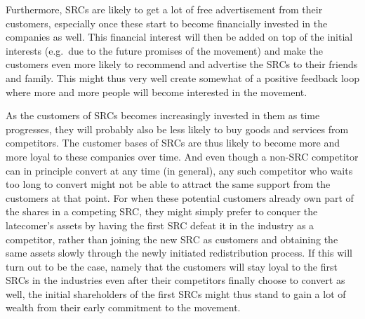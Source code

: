 \documentclass{article}
\begin{document}
Furthermore, SRCs are likely to get a lot of free advertisement from their customers, especially once these start to become financially invested in the companies as well. This financial interest will then be added on top of the initial interests (e.g.\ due to the future promises of the movement) and make the customers even more likely to recommend and advertise the SRCs to their friends and family. This might thus very well create somewhat of a positive feedback loop where more and more people will become interested in the movement.

As the customers of SRCs becomes increasingly invested in them as time progresses, they will probably also be less likely to buy goods and services from competitors. The customer bases of SRCs are thus likely to become more and more loyal to these companies over time.
And even though a non-SRC competitor can in principle convert at any time (in general), any such competitor who waits too long to convert might not be able to attract the same support from the customers at that point. 
For when these potential customers already own part of the shares in a competing SRC, they might simply prefer to conquer the latecomer's assets by having the first SRC defeat it in the industry as a competitor, rather than joining the new SRC as customers and obtaining the same assets slowly through the newly initiated redistribution process. 
If this will turn out to be the case, namely that the customers will stay loyal to the first SRCs in the industries even after their competitors finally choose to convert as well, the initial shareholders of the first SRCs might thus stand to gain a lot of wealth from their early commitment to the movement. 


\end{document}
